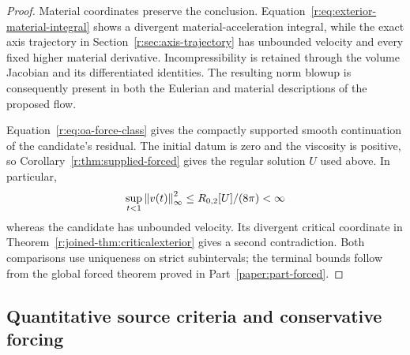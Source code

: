 \begin{proof}
Material coordinates preserve the conclusion.
Equation~\eqref{r:eq:exterior-material-integral} shows a divergent
material-acceleration integral, while the exact axis trajectory in
Section~\ref{r:sec:axis-trajectory} has unbounded velocity and every fixed
higher material derivative. Incompressibility is retained through the
volume Jacobian and its differentiated identities. The resulting norm blowup
is consequently present in both the Eulerian and material descriptions of the
proposed flow.

Equation~\eqref{r:eq:oa-force-class} gives the compactly supported smooth
continuation of the candidate's residual. The initial datum is zero and the
viscosity is positive, so Corollary~\ref{r:thm:supplied-forced} gives the
regular solution \(U\) used above. In particular,
\[
 \sup_{t<1}\left\lVert v(t)\right\rVert_\infty^2\le R_{0,2}[U]/(8\pi)<\infty
\]
whereas the candidate has unbounded velocity. Its divergent critical
coordinate in Theorem~\ref{r:joined-thm:criticalexterior} gives a second
contradiction. Both comparisons use uniqueness on strict subintervals;
the terminal bounds follow from the global forced theorem proved in Part~\ref{paper:part-forced}.
\end{proof}

\subsection{Quantitative source criteria and conservative forcing}

